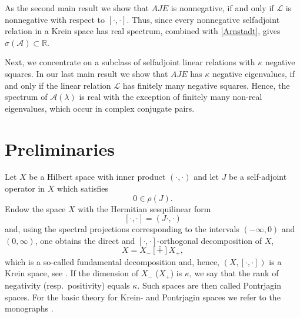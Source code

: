 \documentclass{birkjour}
\theoremstyle{definition}
\theoremstyle{remark}
\numberwithin{equation}{section}
\newcommand{\R}{\mathbb R}
\newcommand{\A}{\mathcal A}
\newcommand{\Ll}{\mathcal L}
\begin{document}
 As the second main result we show that $AJE$ is nonnegative, if and only if $\Ll$ is nonnegative with respect to $[\cdot, \cdot]$. Thus, since every nonnegative selfadjoint relation in a Krein space has real spectrum, combined with \eqref{Arnstadt}, gives $\sigma(\A)\subset \R$. 

Next, we concentrate on a subclass of selfadjoint linear relations  with $\kappa$ negative squares.  In our last main result we show that $AJE$ has $\kappa$ negative eigenvalues, if and only if  the linear relation $\mathcal{L}$ has finitely many negative squares. Hence, the spectrum of $\A(\lambda)$ is real with the exception of finitely many non-real eigenvalues, which occur in complex conjugate pairs.




\section{Preliminaries}\label{Prelim}
Let $X$ be a Hilbert space with inner product $(\cdot, \cdot)$ and let $J$ be a self-adjoint operator in $X$  which satisfies
\begin{equation}\label{Numero}
0\in \rho(J).
\end{equation}
Endow the space $X$ with the Hermitian sesquilinear form 
\begin{equation}\label{NumeroUno}
[\cdot, \cdot]= (J\cdot, \cdot) 
\end{equation}
 and, using the spectral projections corresponding to the intervals $(-\infty,0)$ and $(0,\infty)$, one obtains the direct and $[\cdot, \cdot]$-orthogonal decomposition of $X$,
$$
X = X_-[\dotplus] X_+,
$$
which is a so-called fundamental decomposition and, hence,
$(X, [\cdot,\cdot])$ is a Krein space, see \cite{AI89,B74,G22}.
If the dimension of $X_-$ ($X_+$) is $\kappa$, we say that the rank of negativity (resp.\ positivity) equals $\kappa$. Such spaces are then called Pontrjagin spaces. For the basic theory for Krein- and Pontrjagin spaces we refer to the monographs \cite{AI72,B74,G22,IKL}.
\end{document}

